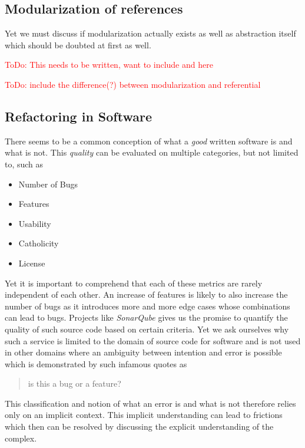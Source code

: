 \documentclass[10pt,twocolumn,letterpaper]{article}
\newcommand\todo[1]{\textcolor{red}{ToDo: #1}}
\begin{document}
\subsection{Modularization of references}

Yet we must discuss if modularization actually exists as well as abstraction itself which should be doubted at first as well.

\todo{This needs to be written, want to include \cite{Teil_Latour_1995} and \cite{Kircz_1998} here}

\todo{include the difference(?) between modularization and referential}

\subsection{Refactoring in Software}

There seems to be a common conception of what a \textit{good} written software is and what is not.
This \textit{quality} can be evaluated on multiple categories, but not limited to, such as

\begin{itemize}
    \itemsep0em
    \item Number of Bugs
    \item Features
    \item Usability
    \item Catholicity
    \item License
\end{itemize}

Yet it is important to comprehend that each of these metrics are rarely independent of each other.
An increase of features is likely to also increase the number of bugs as it introduces more and more edge cases whose combinations can lead to bugs.
Projects like \textit{SonarQube} gives us the promise to quantify the quality of such source code based on certain criteria.
Yet we ask ourselves why such a service is limited to the domain of source code for software and is not used in other domains where an ambiguity between intention and error is possible which is demonstrated by such infamous quotes as 
\begin{quote}
    is this a bug or a feature?
\end{quote}
This classification and notion of what an error is and what is not therefore relies only on an implicit context.
This implicit understanding can lead to frictions which then can be resolved by discussing the explicit understanding of the complex.
\end{document}
